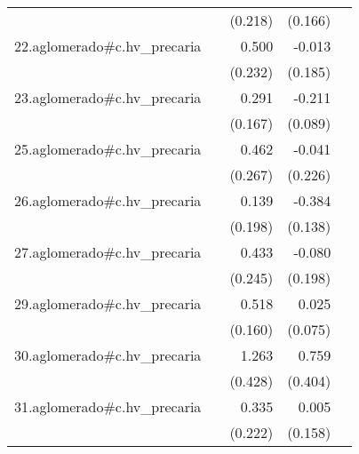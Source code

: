 {\begin{longtable}{l*{4}{D{.}{.}{-1}}}
            &                     &     (0.218)         &     (0.166)         &                     \\
\addlinespace
22.aglomerado#c.hv\_precaria&                     &       0.500\sym{*}  &      -0.013         &                     \\
            &                     &     (0.232)         &     (0.185)         &                     \\
\addlinespace
23.aglomerado#c.hv\_precaria&                     &       0.291         &      -0.211\sym{*}  &                     \\
            &                     &     (0.167)         &     (0.089)         &                     \\
\addlinespace
25.aglomerado#c.hv\_precaria&                     &       0.462         &      -0.041         &                     \\
            &                     &     (0.267)         &     (0.226)         &                     \\
\addlinespace
26.aglomerado#c.hv\_precaria&                     &       0.139         &      -0.384\sym{**} &                     \\
            &                     &     (0.198)         &     (0.138)         &                     \\
\addlinespace
27.aglomerado#c.hv\_precaria&                     &       0.433         &      -0.080         &                     \\
            &                     &     (0.245)         &     (0.198)         &                     \\
\addlinespace
29.aglomerado#c.hv\_precaria&                     &       0.518\sym{**} &       0.025         &                     \\
            &                     &     (0.160)         &     (0.075)         &                     \\
\addlinespace
30.aglomerado#c.hv\_precaria&                     &       1.263\sym{**} &       0.759         &                     \\
            &                     &     (0.428)         &     (0.404)         &                     \\
\addlinespace
31.aglomerado#c.hv\_precaria&                     &       0.335         &       0.005         &                     \\
            &                     &     (0.222)         &     (0.158)         &                     \\

\end{longtable}}
